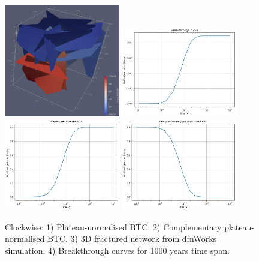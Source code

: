 \documentclass{article}
\begin{document}
\begin{figure}[htbp!]
    \centering
    \includegraphics[width=0.45\textwidth]{images/dfnWorksImages/3DdfnDiffEugV3.png}
    \hspace{0.05\textwidth}
    \includegraphics[width=0.45\textwidth]{images/dfnWorksImages/btcFrom3DeugV3.png}
    \vspace{0.05\textwidth}
    \includegraphics[width=0.45\textwidth]{images/dfnWorksImages/btcFrom3DeugV3norm.png}
    \hspace{0.05\textwidth}
    \includegraphics[width=0.45\textwidth]{images/dfnWorksImages/complementaryBtcFrom3DeugV3norm.png}
    \caption{Clockwise: 1) Plateau-normalised BTC. 2) Complementary plateau-normalised BTC. 3) 3D fractured network from dfnWorks simulation. 4) Breakthrough curves for 1000 years time span.}
    \label{fig:3DdfnWorksEugV3norm}
\end{figure}
\end{document}
